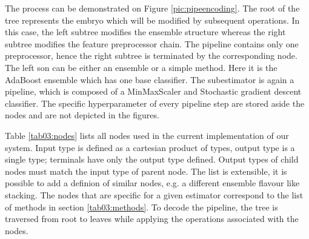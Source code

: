 The process can be demonstrated on Figure
\ref{pic:pipeencoding}. The root of the tree represents the embryo which will
be modified by subsequent operations. In this case, the left subtree modifies
the ensemble structure whereas the right subtree modifies the feature
preprocessor chain. The pipeline contains only one preprocessor, hence the
right subtree is terminated by the corresponding node. The left son can be
either an ensemble or a simple method. Here it is the AdaBoost ensemble which
has one base classifier. The subestimator is again a pipeline, which is composed
of a MinMaxScaler and Stochastic gradient descent classifier. The specific
hyperparameter of every pipeline step are stored aside the nodes and are not
depicted in the figures.

\label{sec:decoding}
Table \ref{tab03:nodes} lists all nodes used in the current implementation of
our system. Input type is defined as a cartesian product of types, output type
is a single type; terminals have only the output type defined. Output types of
child nodes must match the input type of parent node. The list is extensible,
it is possible to add a definion of similar nodes, e.g. a different ensemble
flavour like stacking. The nodes that are specific for a given estimator
correspond to the list of methods in section \ref{tab03:methods}. To decode
the pipeline, the tree is traversed from root to leaves while applying the
operations associated with the nodes.

